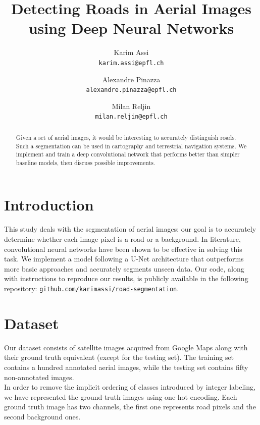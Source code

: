 \documentclass[10pt,conference,compsocconf]{IEEEtran}
\begin{document}
\title{Detecting Roads in Aerial Images using Deep Neural Networks}
\author{
  Karim Assi\\
  \texttt{karim.assi@epfl.ch}
  \and
  Alexandre Pinazza\\
  \texttt{alexandre.pinazza@epfl.ch}
  \and
  Milan Reljin\\
  \texttt{milan.reljin@epfl.ch}
}

\maketitle

\begin{abstract}
    Given a set of aerial images, it would be interesting to accurately distinguish roads. Such a segmentation can be used in cartography and terrestrial navigation systems. We implement and train a deep convolutional network that performs better than simpler baseline models, then discuss possible improvements. 
\end{abstract}

\section{Introduction}

This study deals with the segmentation of aerial images: our goal is to accurately determine whether each image pixel is a road or a background. In literature, convolutional neural networks have been shown to be effective in solving this task. We implement a model following a U-Net architecture that outperforms more basic approaches and accurately segments unseen data. Our code, along with instructions to reproduce our results, is publicly available in the following repository:
\href{https://github.com/karimassi/road-segmentation}{\texttt{github.com/karimassi/road-segmentation}}.

\section{Dataset}

Our dataset consists of satellite images acquired from Google Maps along with their ground truth equivalent (except for the testing set). The training set contains a hundred annotated aerial images, while the testing set contains fifty non-annotated images. \\

In order to remove the implicit ordering of classes introduced by integer labeling, we have represented the ground-truth images using one-hot encoding. Each ground truth image has two channels, the first one represents road pixels and the second background ones.
\end{document}
